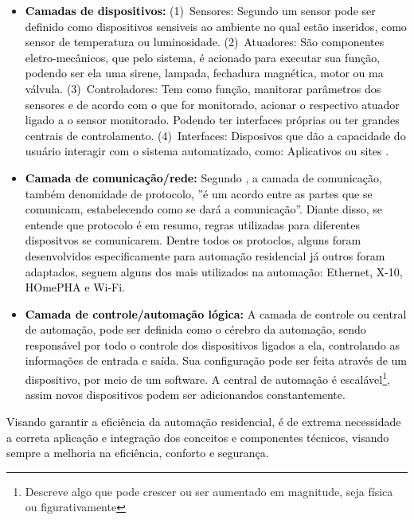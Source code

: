             \begin{itemize}
                \item \textbf{\textcolor{black}{Camadas de dispositivos:}} \textcolor{black}{(1)~Sensores: Segundo \cite{hipolito2018automaccao} um sensor pode ser definido como dispositivos sensiveis ao ambiente no qual estão inseridos, como sensor de temperatura ou luminosidade. (2)~Atuadores: São componentes eletro-mecânicos, que pelo sistema, é acionado para executar sua função, podendo ser ela uma sirene, lampada, fechadura magnética, motor ou ma válvula. (3)~Controladores: Tem como função, manitorar parâmetros dos sensores e de acordo com o que for monitorado, acionar o respectivo atuador ligado a o sensor monitorado. Podendo ter interfaces próprias ou ter grandes centrais de controlamento. (4)~Interfaces: Disposivos que dão a capacidade do usuário interagir com o sistema automatizado, como: Aplicativos ou sites \cite{accardi2012automaccao}.}
                
                \item \textbf{\textcolor{black}{Camada de comunicação/rede:}} \textcolor{black}{Segundo \cite{accardi2012automaccao}, a camada de comunicação, também denomidade de protocolo, ''é um acordo entre as partes que se comunicam, estabelecendo como se dará a comunicação''. Diante disso, se entende que protocolo é em resumo, regras utilizadas para diferentes dispositvos se comunicarem. Dentre todos os protoclos, alguns foram desenvolvidos especificamente para automação residencial já outros foram adaptados, seguem alguns dos mais utilizados na automação: Ethernet, X-10, HOmePHA e Wi-Fi.}
                
                \item \textbf{\textcolor{black}{Camada de controle/automação lógica:}} \textcolor{black}{A camada de controle ou central de automação, pode ser definida como o cérebro da automação, sendo responsável por todo o controle dos dispositivos ligados a ela, controlando as informações de entrada e saída. Sua configuração pode ser feita através de um dispositivo, por meio de um software. A central de automação é escalável\footnote{Descreve algo que pode crescer ou ser aumentado em magnitude, seja física ou figurativamente}, assim novos dispositivos podem ser adicionandos constantemente.}
        
            \end{itemize}

        \textcolor{black}{Visando garantir a eficiência da automação residencial, é de extrema necessidade a correta aplicação e integração dos conceitos e componentes técnicos, visando sempre a melhoria na eficiência, conforto e segurança. }
     
